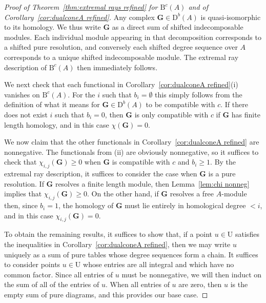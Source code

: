 \documentclass[12pt]{amsart}
\theoremstyle{definition}
\theoremstyle{remark}
\newcommand{\UU}{\mathrm{U}}
\newcommand{\cc}{c}
\newcommand{\Gbull}{\mathbf{G}}
\newcommand{\nothing}{\emptyset}
\newcommand{\DD}{\mathrm{D}}
\newcommand{\BBQ}{\mathrm{B}}
\begin{document}
\begin{proof}[Proof of Theorem~\ref{thm:extremal rays refined} for $\BBQ^{\cc}(A)$ and of Corollary~\ref{cor:dualconeA refined}]

Any complex $\Gbull\in \DD^b(A)$ is quasi-isomorphic to its homology.  We thus write $\Gbull$ as a direct sum of shifted indecomposable modules.  Each individual module appearing in that decomposition corresponds to a shifted pure resolution, and conversely each shifted degree sequence over $A$ corresponds to a unique shifted indecomposable module.  The extremal ray description of $\BBQ^{\cc}(A)$ then immediately follows.

We next check that each functional in Corollary~\ref{cor:dualconeA refined}(i) vanishes on $\BBQ^{\cc}(A)$.  For the $i$ such that $b_i=\nothing$ this simply follows from the definition of what it means for $\Gbull\in \DD^b(A)$ to be compatible with $\cc$.  If there does not exist $i$ such that $b_i=0$, then $\Gbull$ is only compatible with $\cc$ if $\Gbull$ has finite length homology, and in this case $\chi(\Gbull)=0$.  

We now claim that the other functionals in Corollary~\ref{cor:dualconeA refined} are nonnegative.  The functionals from (ii) are obviously nonnegative, so it suffices to check that $\chi_{i,j}(\Gbull)\geq 0$ when $\Gbull$ is compatible with $\cc$ and $b_i\geq 1$.  By the extremal ray description, it suffices to consider the case when $\Gbull$ is a pure resolution.  If $\Gbull$ resolves a finite length module, then Lemma~\ref{lem:chi nonneg} implies that $\chi_{i,j}(\Gbull)\geq 0$.  On the other hand, if $\Gbull$ resolves a free $A$-module then, since $b_i=1$, the homology of $\Gbull$ must lie entirely in homological degree $<i$, and in this case $\chi_{i,j}(\Gbull)=0$.

To obtain the remaining results, it suffices to show that, if a point $u\in \UU$ satisfies the inequalities in Corollary~\ref{cor:dualconeA refined}, then we may write $u$ uniquely as a sum of pure tables whose degree sequences form a chain.  It suffices to consider points $u\in \UU$ whose entries are all integral and which have no common factor.  Since all entries of $u$ must be nonnegative, we will then induct on the sum of all of the entries of $u$.  When all entries of $u$ are zero, then $u$ is the empty sum of pure diagrams, and this provides our base case.


\end{proof}
\end{document}
